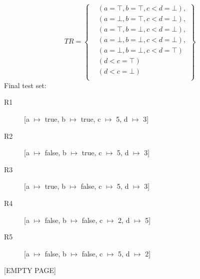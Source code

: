 \documentclass[addpoints, answers]{exam}
\begin{document}
\begin{questions}
\begin{parts}
{	\[
	TR = \left\{
	\begin{aligned}
	& (a = \top, b = \top, c < d = \bot),\\
	& (a = \bot, b = \top, c < d = \bot),\\
	& (a = \top, b = \bot, c < d = \bot),\\
	& (a = \bot, b = \bot, c < d = \bot),\\
	& (a = \bot, b = \bot, c < d = \top) \\
        & (d < c = \top) \\
        & (d < c = \bot) \\
      \end{aligned}
    \right\}
  \]
  Final test set:
  \begin{description}
  \item[R1] [a $\mapsto$ true, b $\mapsto$ true, c $\mapsto$ 5, d $\mapsto$ 3]
  \item[R2] [a $\mapsto$ false, b $\mapsto$ true, c $\mapsto$ 5, d $\mapsto$ 3]
  \item[R3] [a $\mapsto$ true, b $\mapsto$ false, c $\mapsto$ 5, d $\mapsto$ 3]
  \item[R4] [a $\mapsto$ false, b $\mapsto$ false, c $\mapsto$ 2, d $\mapsto$ 5]
  \item[R5] [a $\mapsto$ false, b $\mapsto$ false, c $\mapsto$ 5, d $\mapsto$ 2]
  \end{description}
}

\end{parts}

	\question[10]
	\answer{}

	\question
\fi %

	\newpage
	\begin{center}
		[EMPTY PAGE]
	\end{center}

\end{questions}
\end{document}
